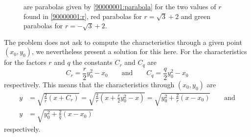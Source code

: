 \begin{loesung}
\begin{figure}
{are parabolas given by \eqref{90000001:parabola} for the two values
of $r$ found in \eqref{90000001:r}, red parabolas for $r=\sqrt{3}+2$ and
green parabolas for $r=-\sqrt{3}+2$.
\label{90000001:char}}
\end{figure}
The problem does not ask to compute the characteristics through a given
point $(x_0,y_0)$, we nevertheless present a solution for this here.
For the characteristics for the factors $r$ and $q$ the constants
$C_r$ and $C_q$ are
\[
C_r=\frac{r}{2}y_0^2-x_0
\qquad
\text{and}
\qquad
C_q=\frac{q}{2}y_0^2-x_0
\]
respectively.
This means that the characteristics through 
$(x_0,y_0)$ are
\begin{align*}
y&=\sqrt{
\frac2r(x+C_r)
}
=
\sqrt{
\frac2r(x+
\frac{r}{2}y_0^2-x
)
}
=\sqrt{y_0^2+\frac2r(x-x_0)}
\qquad\text{and}
\\
y&
=\sqrt{y_0^2+\frac2q(x-x_0)}
\end{align*}
respectively.
\end{loesung}
